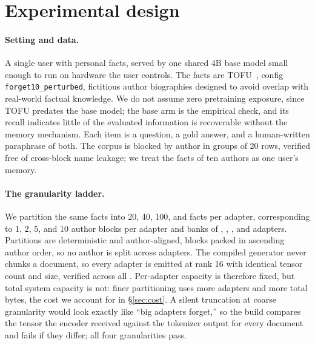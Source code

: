 \documentclass{article}
\begin{document}
\section{Experimental design}
\label{sec:design}

\paragraph{Setting and data.} A single user with \NPerArm{} personal facts, served
by one shared 4B base model small enough to run on hardware the user controls. The
facts are TOFU~\citep{tofu}, config \texttt{forget10\_perturbed}, fictitious author
biographies designed to avoid overlap with real-world factual knowledge. We do not
assume zero pretraining exposure, since TOFU predates the base model; the base arm
is the empirical check, and its \BaseQ{} recall indicates little of the evaluated
information is recoverable without the memory mechanism. Each item is a question, a
gold answer, and a human-written paraphrase of both. The corpus is blocked by
author in groups of 20 rows, verified free of cross-block name leakage; we treat
the \NPerArm{} facts of ten authors as one user's memory.

\paragraph{The granularity ladder.} We partition the same \NPerArm{} facts into
20, 40, 100, and \NPerArm{} facts per adapter, corresponding to 1, 2, 5, and 10
author blocks per adapter and banks of \GTwentyNad{}, \GFortyNad{},
\GHundredNad{}, and \GTwoHundredNad{} adapters. Partitions are deterministic and
author-aligned, blocks packed in ascending author order, so no author is split
across adapters. The compiled generator never chunks a document, so every adapter
is emitted at rank 16 with identical tensor count and size, verified across all
\NAdaptersGated{}. Per-adapter capacity is therefore fixed, but total system
capacity is not: finer partitioning uses more adapters and more total bytes, the
cost we account for in \S\ref{sec:cost}. A silent truncation at coarse
granularity would look exactly like ``big adapters forget,'' so the build compares
the tensor the encoder received against the tokenizer output for every document
and fails if they differ; all four granularities pass.
\end{document}
